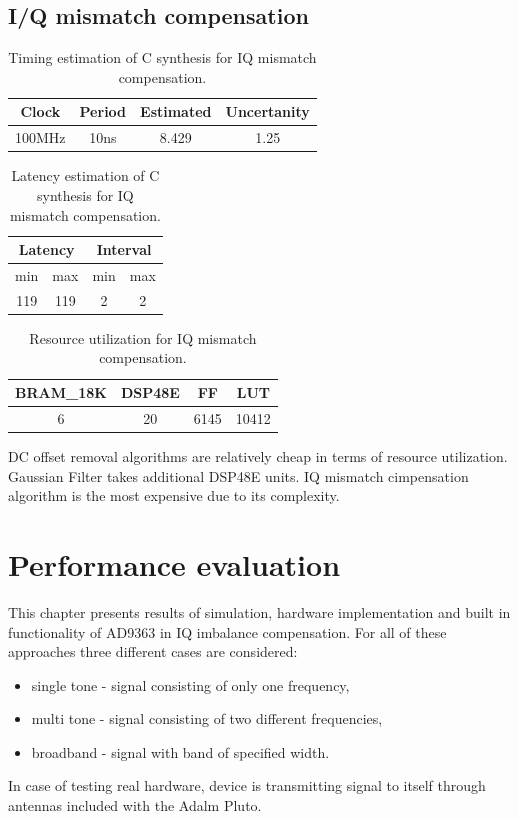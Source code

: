 \documentclass[en,printmode]{mgr}
\begin{document}
	\section{I/Q mismatch compensation}
	\begin{table}[H]
		\centering
		\caption{}
		\begin{tabular}{|c|c|c|c|}
		\hline
		Clock  & Period & Estimated & Uncertanity \\ \hline
		100MHz & 10ns   & 8.429     & 1.25        \\ \hline
		\end{tabular}
		\caption{Timing estimation of C synthesis for IQ mismatch compensation.}
	\end{table}
	
	\begin{table}[H]
		\centering
		\caption{}
		\begin{tabular}{|c|c|c|c|}
		\hline
		\multicolumn{2}{|c|}{Latency} & \multicolumn{2}{c|}{Interval} \\ \hline
			min           & max           & min           & max           \\ \hline
			119           & 119           & 2             & 2             \\ \hline
		\end{tabular}
		\caption{Latency estimation of C synthesis for IQ mismatch compensation.}
	\end{table}
	\begin{table}[H]
		\centering
		\caption{}
		\begin{tabular}{|c|c|c|c|}
		\hline
		BRAM\_18K & DSP48E & FF   & LUT \\ \hline
		6         & 20     & 6145 & 10412\\ \hline
		\end{tabular}
		\caption{Resource utilization for IQ mismatch compensation.}
	\end{table}
	
	DC offset removal algorithms are relatively cheap in terms of resource utilization.
	Gaussian Filter takes additional DSP48E units. IQ mismatch cimpensation algorithm is
	the most expensive due to its complexity.
	
\chapter{Performance evaluation}
	This chapter presents results of simulation, hardware implementation and built in
	functionality of AD9363 in IQ imbalance compensation. For all of these approaches
	three different cases are considered:
	\begin{itemize}
		\item single tone - signal consisting of only one frequency,
		\item multi tone - signal consisting of two different frequencies,
		\item broadband - signal with band of specified width.
	\end{itemize}
	In case of testing real hardware, device is transmitting signal to itself through antennas
	included with the Adalm Pluto.
	\vspace{1cm}
\end{document}
